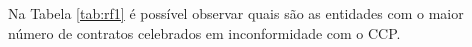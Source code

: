 Na Tabela \ref{tab:rf1} é possível observar quais são as entidades com o maior número de contratos celebrados em inconformidade com o CCP. 




